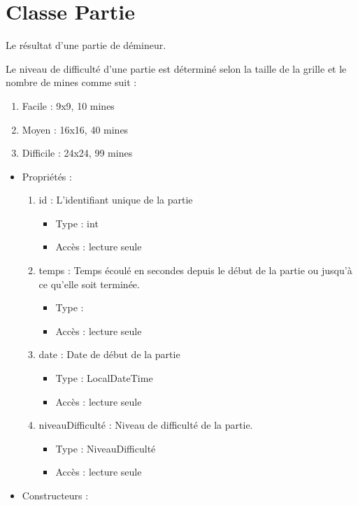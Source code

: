 \section{Classe Partie}

Le résultat d'une partie de démineur.

Le niveau de difficulté d'une partie est déterminé selon la taille de la grille et le nombre de mines comme suit :

\begin{enumerate}
\item Facile : 9x9, 10 mines
\item Moyen : 16x16, 40 mines
\item Difficile : 24x24, 99 mines
\end{enumerate}

\begin{itemize}
\item Propriétés : 
  \begin{enumerate}
  \item id : L'identifiant unique de la partie
    \begin{itemize}
    \item Type : int
    \item Accès : lecture seule
    \end{itemize}
  \item temps : Temps écoulé en secondes depuis le début de la partie ou jusqu'à ce qu'elle soit terminée.
    \begin{itemize}
    \item Type : 
    \item Accès : lecture seule
    \end{itemize}
  \item date : Date de début de la partie
    \begin{itemize}
    \item Type : LocalDateTime
    \item Accès : lecture seule
    \end{itemize}
  \item niveauDifficulté : Niveau de difficulté de la partie.
    \begin{itemize}
    \item Type : NiveauDifficulté
    \item Accès : lecture seule
    \end{itemize}

  \end{enumerate}

\item Constructeurs : 


\end{itemize}
